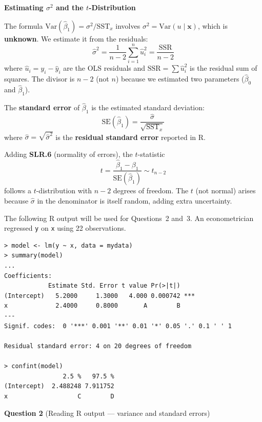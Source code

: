 \documentclass[11pt,a4paper]{article}
\begin{document}
\begin{bookexample}
\textbf{\color{blockcolor}Estimating $\sigma^2$ and the $t$-Distribution}

\smallskip
The formula $\text{Var}(\hat{\beta}_1) = \sigma^2/\text{SST}_x$ involves $\sigma^2 = \text{Var}(u \mid \mathbf{x})$, which is \textbf{unknown}. We estimate it from the residuals:
\[
  \hat{\sigma}^2 = \frac{1}{n-2}\sum_{i=1}^{n} \hat{u}_i^2
  = \frac{\text{SSR}}{n-2}
\]
where $\hat{u}_i = y_i - \hat{y}_i$ are the OLS residuals and $\text{SSR} = \sum \hat{u}_i^2$ is the residual sum of squares. The divisor is $n - 2$ (not $n$) because we estimated two parameters ($\hat{\beta}_0$ and $\hat{\beta}_1$).

\smallskip
The \textbf{standard error} of $\hat{\beta}_1$ is the estimated standard deviation:
\[
  \text{SE}(\hat{\beta}_1) = \frac{\hat{\sigma}}{\sqrt{\text{SST}_x}}
\]
where $\hat{\sigma} = \sqrt{\hat{\sigma}^2}$ is the \textbf{residual standard error} reported in R.

\smallskip
Adding \textbf{SLR.6} (normality of errors), the $t$-statistic
\[
  t = \frac{\hat{\beta}_1 - \beta_1}{\text{SE}(\hat{\beta}_1)} \sim t_{n-2}
\]
follows a $t$-distribution with $n - 2$ degrees of freedom. The $t$ (not normal) arises because $\hat{\sigma}$ in the denominator is itself random, adding extra uncertainty.
\end{bookexample}

\bigskip

The following R output will be used for Questions~2 and~3. An econometrician regressed \verb!y! on \verb!x! using 22 observations.
\small
\begin{verbatim}
> model <- lm(y ~ x, data = mydata)
> summary(model)
...
Coefficients:
            Estimate Std. Error t value Pr(>|t|)
(Intercept)   5.2000     1.3000   4.000 0.000742 ***
x             2.4000     0.8000       A        B
---
Signif. codes:  0 '***' 0.001 '**' 0.01 '*' 0.05 '.' 0.1 ' ' 1

Residual standard error: 4 on 20 degrees of freedom

> confint(model)
                2.5 %   97.5 %
(Intercept)  2.488248 7.911752
x                   C        D
\end{verbatim}
\normalsize

\bigskip
\textbf{Question 2} (Reading R output --- variance and standard errors)
\end{document}
